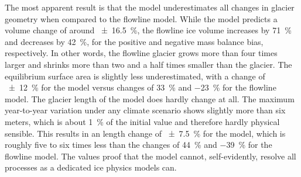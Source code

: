         The most apparent result is that the \vas{} model underestimates all changes in glacier geometry when compared to the flowline model. While the \vas{} model predicts a volume change of around \SI{\pm16.5}{\percent}, the flowline ice volume increases by \SI{71}{\percent} and decreases by \SI{42}{\percent}, for the positive and negative mass balance bias, respectively. In other words, the flowline glacier grows more than four times larger and shrinks more than two and a half times smaller than the \vas{} glacier.
        The equilibrium surface area is slightly less underestimated, with a change of \SI{\pm12}{\percent} for the \vas{} model versus changes of \SI{+33}{\percent} and \SI{-23}{\percent} for the flowline model. The glacier length of the \vas{} model does hardly change at all. The maximum year-to-year variation under any climate scenario shows slightly more than six meters, which is about \SI{1}{\percent} of the initial value and therefore hardly physical sensible. This results in an length change of \SI{\pm7.5}{\percent} for the \vas{} model, which is roughly five to six times less than the changes of \SI{+44}{\percent} and \SI{-39}{\percent} for the flowline model. The values proof that the \vas{} model cannot, self-evidently, resolve all processes as a dedicated ice physics models can. 
        
